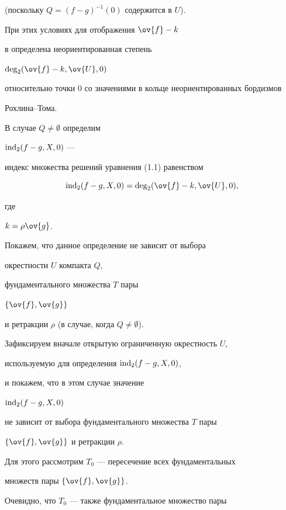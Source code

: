 (поскольку $Q = (f - g)^{-1}(0)$ содержится в $U$).


При этих условиях для отображения $\ov {f} - k$


в \cite{4} определена неориентированная степень 


$\Deg_2 (\ov{f}-k, \ov{U}, 0)$


относительно точки 0 со значениями в кольце неориентированных бордизмов


Рохлина--Тома.





\begin{defns}


В случае $Q \ne \emptyset$ определим


$\operatorname{ind}_2 (f - g, X, 0)$ ---


индекс множества решений уравнения (1.1) равенством


$$


\Ind_2 (f - g, X, 0) = 


\Deg_2 (\ov{f}- k, \ov{U}, 0),


$$


где


$k = \rho \ov {g}$.


\end{defns}





Покажем, что данное определение не зависит от выбора


окрестности $U$ компакта $Q$,


фундаментального множества $T$ пары


$\{\ov{f}, \ov{g} \}$


и ретракции $\rho$ (в случае, когда $Q\neq \emptyset$).


Зафиксируем вначале открытую ограниченную окрестность $U$,


используемую для определения $\operatorname{ind}_2 (f - g, X, 0)$,


и покажем, что в этом случае значение


$\operatorname{ind}_2 (f - g, X, 0)$


не зависит от выбора фундаментального множества $T$ пары


$\{\ov{f}, \ov{g} \}$ и ретракции $\rho$.


Для этого рассмотрим $T_0$ --- пересечение всех фундаментальных


множеств пары $\{\ov {f}, \ov{g} \}$.


Очевидно, что $T_0$ --- также фундаментальное множество пары 


